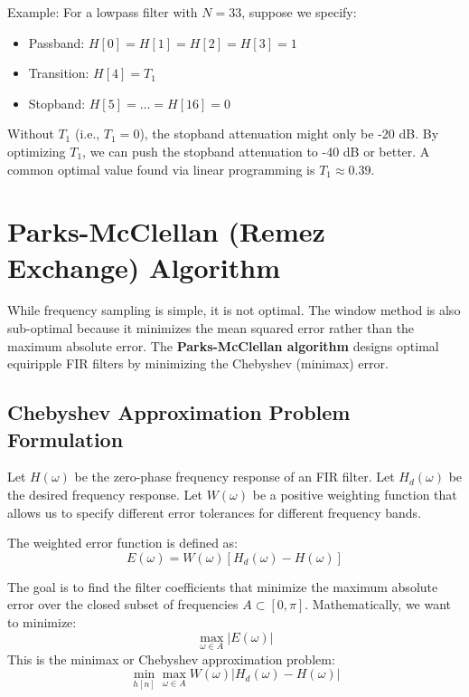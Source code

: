 \documentclass[11pt,a4paper]{article}
\begin{document}
Example:
For a lowpass filter with $N = 33$, suppose we specify:
\begin{itemize}
    \item Passband: $H[0] = H[1] = H[2] = H[3] = 1$
    \item Transition: $H[4] = T_1$
    \item Stopband: $H[5] = \dots = H[16] = 0$
\end{itemize}

Without $T_1$ (i.e., $T_1 = 0$), the stopband attenuation might only be -20 dB.
By optimizing $T_1$, we can push the stopband attenuation to -40 dB or better. A common optimal value found via linear programming is $T_1 \approx 0.39$.

\section{Parks-McClellan (Remez Exchange) Algorithm}

While frequency sampling is simple, it is not optimal. The window method is also sub-optimal because it minimizes the mean squared error rather than the maximum absolute error. The \textbf{Parks-McClellan algorithm} designs optimal equiripple FIR filters by minimizing the Chebyshev (minimax) error.

\subsection{Chebyshev Approximation Problem Formulation}
Let $H(\omega)$ be the zero-phase frequency response of an FIR filter.
Let $H_d(\omega)$ be the desired frequency response.
Let $W(\omega)$ be a positive weighting function that allows us to specify different error tolerances for different frequency bands.

The weighted error function is defined as:
\begin{equation}
E(\omega) = W(\omega) [H_d(\omega) - H(\omega)]
\end{equation}

The goal is to find the filter coefficients that minimize the maximum absolute error over the closed subset of frequencies $A \subset [0, \pi]$. Mathematically, we want to minimize:
\begin{equation}
\max_{\omega \in A} |E(\omega)|
\end{equation}
This is the minimax or Chebyshev approximation problem:
\begin{equation}
\min_{h[n]} \max_{\omega \in A} W(\omega) |H_d(\omega) - H(\omega)|
\end{equation}
\end{document}
